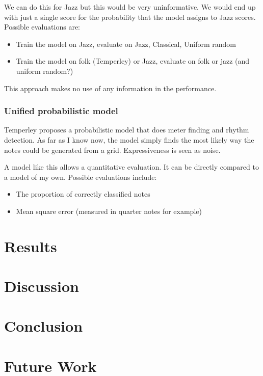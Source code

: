 \documentclass[a4paper,10pt]{article}
\begin{document}
We can do this for Jazz but this would be very uninformative. We would end up with just a single score for the probability that the model assigns to Jazz scores. Possible evaluations are:
\begin{itemize}
\item Train the model on Jazz, evaluate on Jazz, Classical, Uniform random
\item Train the model on folk (Temperley) or Jazz, evaluate on folk or jazz (and uniform random?)
\end{itemize}

This approach makes no use of any information in the performance. 

\subsubsection*{Unified probabilistic model}
Temperley proposes a probabilistic model that does meter finding and rhythm detection. As far as I know now, the model simply finds the most likely way the notes could be generated from a grid. Expressiveness is seen as noise.

A model like this allows a quantitative evaluation. It can be directly compared to a model of my own. Possible evaluations include:
\begin{itemize}
\item The proportion of correctly classified notes
\item Mean square error (measured in quarter notes for example)
\end{itemize}

\section{Results}
\label{sec:results}

\section{Discussion}
\label{sec:discussion}

\section{Conclusion}
\label{sec:conclusion}

\section{Future Work}
\label{sec:futurework}




\end{document}
